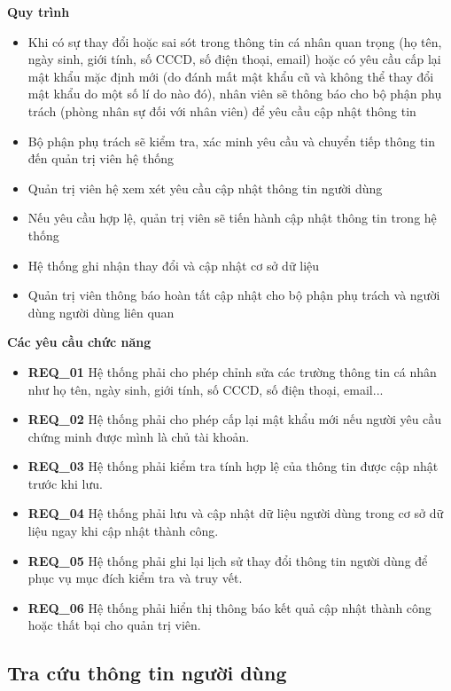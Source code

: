 \noindent \textbf{Quy trình}

\begin{itemize}
  \item Khi có sự thay đổi hoặc sai sót trong thông tin cá nhân quan trọng (họ tên, ngày sinh, giới tính, số CCCD, số điện thoại, email) hoặc có yêu cầu cấp lại mật khẩu mặc định mới (do đánh mất mật khẩu cũ và không thể thay đổi mật khẩu do một số lí do nào đó),  nhân viên sẽ thông báo cho bộ phận phụ trách (phòng nhân sự đối với nhân viên) để yêu cầu cập nhật thông tin
  \item Bộ phận phụ trách sẽ kiểm tra, xác minh yêu cầu và chuyển tiếp thông tin đến quản trị viên hệ thống
  \item Quản trị viên hệ xem xét yêu cầu cập nhật thông tin người dùng
  \item Nếu yêu cầu hợp lệ, quản trị viên sẽ tiến hành cập nhật thông tin trong hệ thống
  \item Hệ thống ghi nhận thay đổi và cập nhật cơ sở dữ liệu
  \item Quản trị viên thông báo hoàn tất cập nhật cho bộ phận phụ trách và người dùng người dùng liên quan
\end{itemize}

\noindent \textbf{Các yêu cầu chức năng}

\begin{itemize}
  \item \textbf{REQ\_01} Hệ thống phải cho phép chỉnh sửa các trường thông tin cá nhân như họ tên, ngày sinh, giới tính, số CCCD, số điện thoại, email...
  \item \textbf{REQ\_02} Hệ thống phải cho phép cấp lại mật khẩu mới nếu người yêu cầu chứng minh được mình là chủ tài khoản.
  \item \textbf{REQ\_03} Hệ thống phải kiểm tra tính hợp lệ của thông tin được cập nhật trước khi lưu.
  \item \textbf{REQ\_04} Hệ thống phải lưu và cập nhật dữ liệu người dùng trong cơ sở dữ liệu ngay khi cập nhật thành công.
  \item \textbf{REQ\_05} Hệ thống phải ghi lại lịch sử thay đổi thông tin người dùng để phục vụ mục đích kiểm tra và truy vết.
  \item \textbf{REQ\_06} Hệ thống phải hiển thị thông báo kết quả cập nhật thành công hoặc thất bại cho quản trị viên.
\end{itemize}

\subsection{Tra cứu thông tin người dùng}


